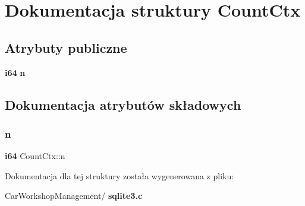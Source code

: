 \section{Dokumentacja struktury Count\+Ctx}
\label{struct_count_ctx}
\subsection*{Atrybuty publiczne}
\begin{DoxyCompactItemize}
\item 
\textbf{ i64} \textbf{ n}
\end{DoxyCompactItemize}


\subsection{Dokumentacja atrybutów składowych}
\mbox{\label{struct_count_ctx_a141c718918dbfaa183f772bfd7a516f4}} 
\subsubsection{n}
{\footnotesize\ttfamily \textbf{ i64} Count\+Ctx\+::n}



Dokumentacja dla tej struktury została wygenerowana z pliku\+:\begin{DoxyCompactItemize}
\item 
Car\+Workshop\+Management/\textbf{ sqlite3.\+c}\end{DoxyCompactItemize}
